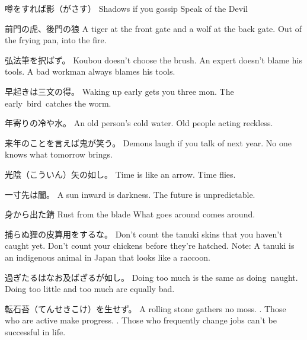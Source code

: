 \par{噂をすれば影（がさす） \hfill\break
Shadows if you gossip \hfill\break
Speak of the Devil }

\par{前門の虎、後門の狼 \hfill\break
A tiger at the front gate and a wolf at the back gate. \hfill\break
Out of the frying pan, into the fire. }

\par{弘法筆を択ばず。 \hfill\break
Koubou doesn't choose the brush. \hfill\break
An expert doesn't blame his tools. \hfill\break
A bad workman always blames his tools. }

\par{早起きは三文の得。 \hfill\break
Waking up early gets you three mon. \hfill\break
The early bird catches the worm. }

\par{年寄りの冷や水。 \hfill\break
An old person's cold water. \hfill\break
Old people acting reckless. }

\par{来年のことを言えば鬼が笑う。 \hfill\break
Demons laugh if you talk of next year. \hfill\break
No one knows what tomorrow brings. }

\par{光陰（こういん）矢の如し。 \hfill\break
Time is like an arrow. \hfill\break
Time flies. }

\par{一寸先は闇。 \hfill\break
A sun inward is darkness. \hfill\break
The future is unpredictable. }

\par{身から出た錆 \hfill\break
Rust from the blade \hfill\break
What goes around comes around. }

\par{捕らぬ狸の皮算用をするな。 \hfill\break
Don't count the tanuki skins that you haven't caught yet. \hfill\break
Don't count your chickens before they're hatched. \hfill\break
Note: A tanuki is an indigenous animal in Japan that looks like a raccoon. }

\par{過ぎたるはなお及ばざるが如し。 \hfill\break
Doing too much is the same as doing naught. \hfill\break
Doing too little and too much are equally bad. }

\par{転石苔（てんせきこけ）を生せず。 \hfill\break
A rolling stone gathers no moss. \hfill{}. Those who are active make progress. \hfill{}. Those who frequently change jobs can't be successful in life. }

